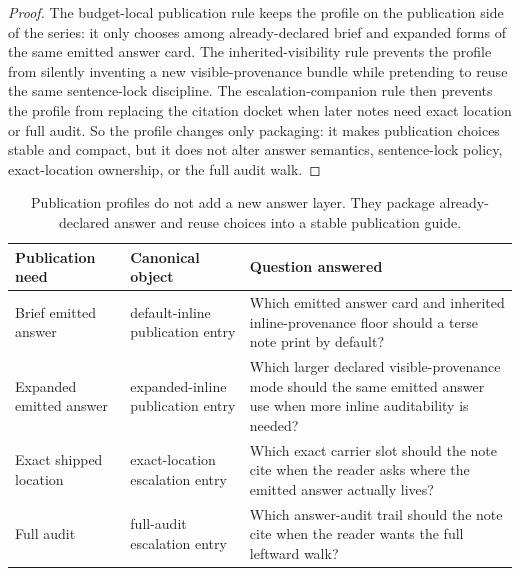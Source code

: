 \documentclass[11pt]{article}
\begin{document}
\begin{proof}
The budget-local publication rule keeps the profile on the publication side of the series: it only chooses among already-declared brief and expanded forms of the same emitted answer card.
The inherited-visibility rule prevents the profile from silently inventing a new visible-provenance bundle while pretending to reuse the same sentence-lock discipline.
The escalation-companion rule then prevents the profile from replacing the citation docket when later notes need exact location or full audit.
So the profile changes only packaging: it makes publication choices stable and compact, but it does not alter answer semantics, sentence-lock policy, exact-location ownership, or the full audit walk.\qedhere
\end{proof}

\begin{table}[t]
\centering
\small
\begin{tabularx}{\linewidth}{@{}l l X@{}}
\toprule
Publication need & Canonical object & Question answered \\
\midrule
Brief emitted answer & default-inline publication entry & Which emitted answer card and inherited inline-provenance floor should a terse note print by default? \\
Expanded emitted answer & expanded-inline publication entry & Which larger declared visible-provenance mode should the same emitted answer use when more inline auditability is needed? \\
Exact shipped location & exact-location escalation entry & Which exact carrier slot should the note cite when the reader asks where the emitted answer actually lives? \\
Full audit & full-audit escalation entry & Which answer-audit trail should the note cite when the reader wants the full leftward walk? \\
\bottomrule
\end{tabularx}
\caption{Publication profiles do not add a new answer layer. They package already-declared answer and reuse choices into a stable publication guide.}
\label{tab:answerpublicationprofiles}
\end{table}
\end{document}
